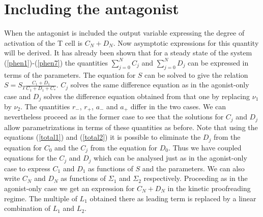 \documentclass{article}
\begin{document}
\section{Including the antagonist}\label{antagonist}

When the antagonist is included the output variable expressing the degree of
activation of the T cell is $C_N+D_N$. Now asymptotic expressions for this
quantity will be derived. It has already been shown that for a steady state of 
the system (\ref{phen1})-(\ref{phen7}) the quantities $\sum_{j=0}^NC_j$ and 
$\sum_{j=0}^ND_j$ can be expressed in terms of the parameters. The equation for 
$S$ can be solved to give the relation $S=S_T\frac{C_1+D_1}{C_1+D_1+C_*}$. $C_j$ 
solves the same difference equation as in the agonist-only case and $D_j$ 
solves the difference equation obtained from that one by replacing $\nu_1$ by 
$\nu_2$. The quantities $r_-$, $r_+$, $a_-$ and $a_+$ differ in the two cases. We
can nevertheless proceed as in the former case to see that the solutions
for $C_j$ and $D_j$ allow parametrizations in terms of these quantities as
before. Note that using the equations (\ref{total1}) and (\ref{total2}) 
it is possible to eliminate the $D_j$ from the equation for $C_0$ and the 
$C_j$ from the equation for $D_0$. Thus we have coupled equations for the 
$C_j$ and $D_j$ which can be analysed just as in the agonist-only case to
express $C_1$ and $D_1$ as functions of $S$ and the parameters. We can also
write $C_N$ and $D_N$ as functions of $\Sigma_1$ and $\Sigma_2$ respectively.
Proceeding as in the agonist-only case we get an expression for $C_N+D_N$ in 
the kinetic proofreading regime. The multiple of $L_1$ obtained there as 
leading term is replaced by a linear combination of $L_1$ and $L_2$.
\end{document}

